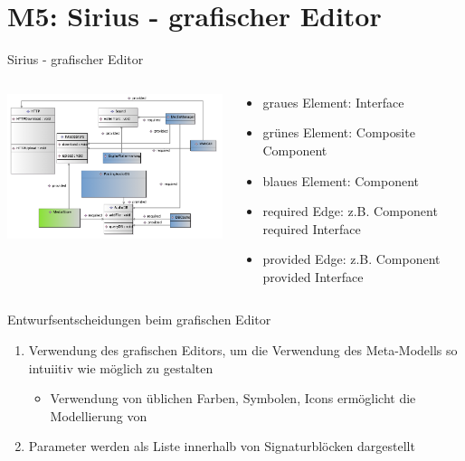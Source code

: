 \section[M5: Sirius]{M5: Sirius - grafischer Editor}
\begin{frame}{Sirius - grafischer Editor}
	\vspace{-5mm}
	\begin{columns}
		\begin{contentblock}{}
			\includegraphics[width=86mm]{figures/sirius.png}
		\end{contentblock}
		\begin{contentblock}{}
			\begin{itemize}
				\item graues Element: Interface
				\item grünes Element: Composite Component
				\item blaues Element: Component
				\item required Edge: z.B. Component required Interface 
				\item provided Edge: z.B. Component provided Interface
			\end{itemize}
		\end{contentblock}
	\end{columns}
\end{frame}

\begin{frame}{Entwurfsentscheidungen beim grafischen Editor}
	\begin{enumerate}
		\item Verwendung des grafischen Editors, um die Verwendung des Meta-Modells so intuiitiv wie möglich zu gestalten
		\begin{itemize}
			\item Verwendung von üblichen Farben, Symbolen, Icons ermöglicht die Modellierung von 
		\end{itemize}
		\item Parameter werden als Liste innerhalb von Signaturblöcken dargestellt
	\end{enumerate}
\end{frame}

